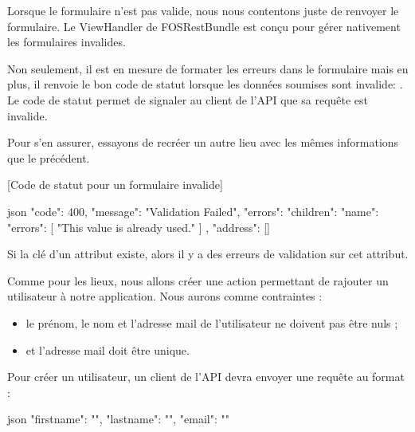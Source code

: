 \documentclass[big]{zmdocument}
\begin{document}


Lorsque le formulaire n'est pas valide, nous nous contentons juste de renvoyer le formulaire. Le ViewHandler de FOSRestBundle est conçu pour gérer nativement les formulaires invalides.



Non seulement, il est en mesure de formater les erreurs dans le formulaire mais en plus, il renvoie le bon code de statut lorsque les données soumises sont invalide: .
Le code de statut  permet de signaler au client de l'API que sa requête est invalide.



Pour s'en assurer, essayons de recréer un autre lieu avec les mêmes informations que le précédent.



[Code de statut pour un formulaire invalide]


\begin{CodeBlock}{json}
{
  "code": 400,
  "message": "Validation Failed",
  "errors": {
    "children": {
      "name": {
        "errors": [
          "This value is already used."
        ]
      },
      "address": []
    }
  }
}
\end{CodeBlock}



Si la clé  d'un attribut existe, alors il y a des erreurs de validation sur cet attribut.





Comme pour les lieux, nous allons créer une action permettant de rajouter un utilisateur à notre application. Nous aurons comme contraintes :



\begin{itemize}
\item le prénom, le nom et l'adresse mail de l'utilisateur ne doivent pas être nuls ;
\item et l'adresse mail doit être unique.
\end{itemize}


Pour créer un utilisateur, un client de l'API devra envoyer une requête au format :



\begin{CodeBlock}{json}
{
    "firstname": "",
    "lastname": "",
    "email": ""
}
\end{CodeBlock}
\end{document}

